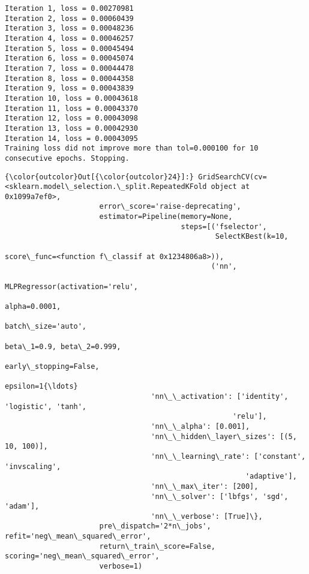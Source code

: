 \documentclass[11pt]{article}
\begin{document}
    \begin{Verbatim}[commandchars=\\\{\}]
Iteration 1, loss = 0.00270981
Iteration 2, loss = 0.00060439
Iteration 3, loss = 0.00048236
Iteration 4, loss = 0.00046257
Iteration 5, loss = 0.00045494
Iteration 6, loss = 0.00045074
Iteration 7, loss = 0.00044478
Iteration 8, loss = 0.00044358
Iteration 9, loss = 0.00043839
Iteration 10, loss = 0.00043618
Iteration 11, loss = 0.00043370
Iteration 12, loss = 0.00043098
Iteration 13, loss = 0.00042930
Iteration 14, loss = 0.00043095
Training loss did not improve more than tol=0.000100 for 10 consecutive epochs. Stopping.

    \end{Verbatim}

\begin{Verbatim}[commandchars=\\\{\}]
{\color{outcolor}Out[{\color{outcolor}24}]:} GridSearchCV(cv=<sklearn.model\_selection.\_split.RepeatedKFold object at 0x1099a7ef0>,
                      error\_score='raise-deprecating',
                      estimator=Pipeline(memory=None,
                                         steps=[('fselector',
                                                 SelectKBest(k=10,
                                                             score\_func=<function f\_classif at 0x1234806a8>)),
                                                ('nn',
                                                 MLPRegressor(activation='relu',
                                                              alpha=0.0001,
                                                              batch\_size='auto',
                                                              beta\_1=0.9, beta\_2=0.999,
                                                              early\_stopping=False,
                                                              epsilon=1{\ldots}
                                  'nn\_\_activation': ['identity', 'logistic', 'tanh',
                                                     'relu'],
                                  'nn\_\_alpha': [0.001],
                                  'nn\_\_hidden\_layer\_sizes': [(5, 10, 100)],
                                  'nn\_\_learning\_rate': ['constant', 'invscaling',
                                                        'adaptive'],
                                  'nn\_\_max\_iter': [200],
                                  'nn\_\_solver': ['lbfgs', 'sgd', 'adam'],
                                  'nn\_\_verbose': [True]\},
                      pre\_dispatch='2*n\_jobs', refit='neg\_mean\_squared\_error',
                      return\_train\_score=False, scoring='neg\_mean\_squared\_error',
                      verbose=1)
\end{Verbatim}
            
\end{document}
